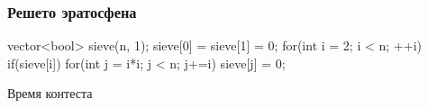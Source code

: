 
\begin{frame}[fragile]
	\frametitle{Решето эратосфена}
    \begin{cpp}
vector<bool> sieve(n, 1);
sieve[0] = sieve[1] = 0;
for(int i = 2; i < n; ++i){
    if(sieve[i]){
        for(int j = i*i; j < n; j+=i){
            sieve[j] = 0;
        }
    }
}
    \end{cpp}

\end{frame}


\begin{frame}
    \center \Huge Время контеста 
\end{frame}

